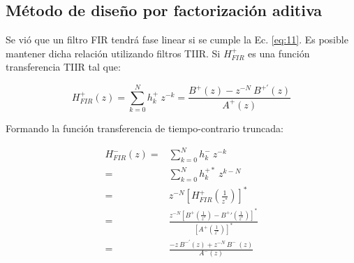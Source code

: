 \message{ !name(../main.tex)}\documentclass[journal,transmag]{IEEEtran}
\begin{document}
\subsection{Método de diseño por factorización aditiva}
    Se vió que un filtro FIR tendrá fase linear si se cumple la Ec. \ref{eq:11}. Es posible mantener dicha relación utilizando filtros TIIR. Si $H_{FIR}^{+}$ es una función transferencia TIIR tal que:

    \begin{equation}
      H_{FIR}^{+}(z) = \sum_{k=0}^{N} {h_{k}^{+} \: z^{-k}} = \frac{B^{+}(z) - z^{-N} \: B^{+\prime} (z)}{A^{+} (z)}
      \label{eq:42}
    \end{equation}

    Formando la función transferencia de tiempo-contrario truncada:

    \begin{align}
      H_{FIR}^{-} (z) =& \sum_{k=0}^{N} {h_{k}^{-} \: z^{-k}} \\
      =& \sum_{k=0}^{N} {h_{k}^{+*} \: z^{k-N}} \\
      =& z^{-N} \left[ H_{FIR}^{ +} \left( \frac{1}{z^{*}} \right) \right] ^{*} \\
      =& \frac{z^{-N} \left[ B^{+} \left( \frac{1}{z^{*}} \right) - B^{+}' \left( \frac{1}{z^{*}} \right) \right] ^{*}}{\left[ A^{ + } \left( \frac{1}{z^{*}} \right) \right] ^{*}} \\
      =& \frac{-z \: B^{-\prime} (z) + z^{-N} \: B^{-} \: (z)}{A^{-}  (z)}
         \label{eq:47}
    \end{align}



\end{document}
